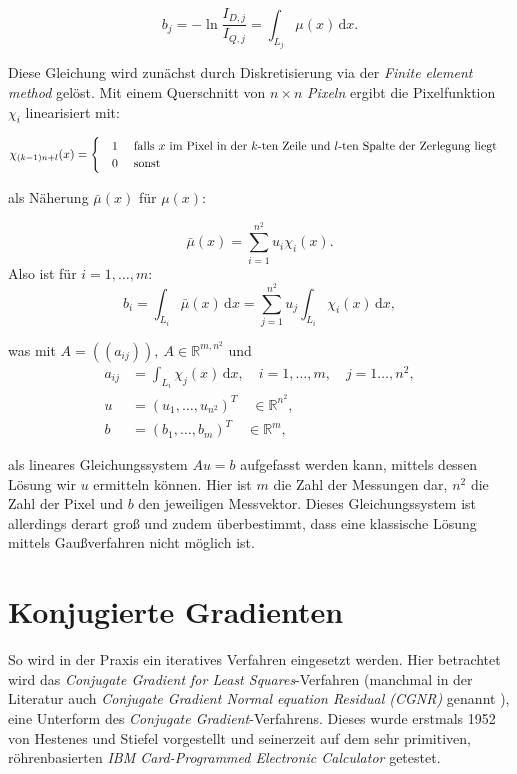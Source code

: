 \begin{equation}
b_{j}
= - \ln{\frac{I_{D,j}}{I_{Q,j}}}
=\int _{L_j}\mu(x)\,\mathrm {d} x.
\end{equation}

Diese Gleichung wird zunächst durch Diskretisierung via der \textit{Finite element method} gelöst. Mit einem Querschnitt von $n\times n$ \textit{Pixeln} ergibt die Pixelfunktion $ \chi_i $ linearisiert mit:

\begin{equation}
\chi_{(k-1)n+l}(x)= 
\begin{cases}
\quad 1 \text{ \quad falls } x \text{ im Pixel in der } k\text{-ten Zeile und } l\text{-ten Spalte der Zerlegung liegt} \\
\quad 0 \text{ \quad sonst}
\end{cases}
\end{equation}

als Näherung $ \bar{\mu}(x) $ für $ \mu(x) $:

\begin{equation}
 \bar{\mu}(x) = \sum_{i = 1}^{n^2}  u_i \chi_i(x).
 \end{equation}
Also ist für $i=1,\dots,m$:
\begin{equation}
b_{i}
=\int _{L_i}\bar{\mu}(x)\,\mathrm {d} x =  \sum_{j = 1}^{n^2}  u_j \int_{L_i} \chi_i(x)\, \mathrm {d} x ,
\end{equation}

was mit $ A=((a_{ij})),\ A\in \mathbb{R}^{m,n^2}$ und
\begin{align}
    a_{ij} &=  \int_{L_i} \chi_j(x)\, \mathrm {d} x, \quad i=1,\dots,m,\quad j=1\dots,n^2,  \\
        u &= (u_1,\dots,u_{n^2})^T \quad \in \mathbb{R}^{n^2},\\
        b &= (b_1,\dots,b_{m})^T \quad \in \mathbb{R}^{m},
\end{align}

als lineares Gleichungssystem $Au=b$ aufgefasst werden kann, mittels dessen Lösung wir $u$ ermitteln können.
Hier ist $m$ die Zahl der Messungen dar, $n^2$ die Zahl der Pixel und $b$ den jeweiligen Messvektor.
Dieses Gleichungssystem ist allerdings derart groß und zudem überbestimmt, dass eine klassische Lösung mittels Gaußverfahren nicht möglich ist.

\section{Konjugierte Gradienten}
So wird in der Praxis ein iteratives Verfahren eingesetzt werden.
Hier betrachtet wird das \textit{Conjugate Gradient for Least Squares}-Verfahren (manchmal in der Literatur auch \textit{Conjugate Gradient Normal equation Residual (CGNR)} genannt \cite{Golub}),
eine Unterform des \textit{Conjugate Gradient}-Verfahrens.
Dieses wurde erstmals 1952 von Hestenes und Stiefel vorgestellt \cite{Hestenes1952} und seinerzeit auf dem sehr primitiven, röhrenbasierten \textit{IBM Card-Programmed Electronic Calculator} \cite{ibm603} getestet.

